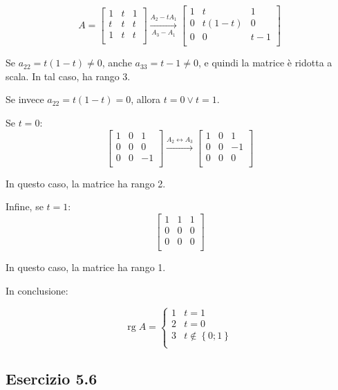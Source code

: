 \documentclass{article}
\DeclareMathOperator{\rg}{rg}  %
\begin{document}
\[A = \begin{bmatrix}
    1 & t & 1 \\
    t & t & t \\
    1 & t & t \\
\end{bmatrix}
\overset{A_2-tA_1}{\underset{A_3-A_1}{\longrightarrow}}
\begin{bmatrix}
    1 & t & 1 \\
    0 & t(1-t) & 0 \\
    0 & 0 & t-1 \\
\end{bmatrix}
\]

Se $a_{22} = t(1-t) \ne 0$, anche $a_{33} = t-1 \ne 0$,
e quindi la matrice è ridotta a scala. In tal caso, ha rango 3.

Se invece $a_{22} = t(1-t) = 0$, allora $t=0\vee t=1$.

Se $t=0$:
\[\begin{bmatrix}
    1 & 0 & 1 \\
    0 & 0 & 0 \\
    0 & 0 & -1 \\
\end{bmatrix}
\overset{A_2\leftrightarrow A_3}{\longrightarrow}
\begin{bmatrix}
    1 & 0 & 1 \\
    0 & 0 & -1 \\
    0 & 0 & 0 \\
\end{bmatrix}\]

In questo caso, la matrice ha rango 2.

Infine, se $t = 1$:
\[\begin{bmatrix}
    1 & 1 & 1 \\
    0 & 0 & 0 \\
    0 & 0 & 0 \\
\end{bmatrix}\]

In questo caso, la matrice ha rango 1.

In conclusione:

\[\rg{A} = \begin{cases}
    1 & t = 1 \\
    2 & t = 0 \\
    3 & t \notin \left\{ 0; 1 \right\} \\
\end{cases}\]



\subsection*{Esercizio 5.6}
\end{document}
